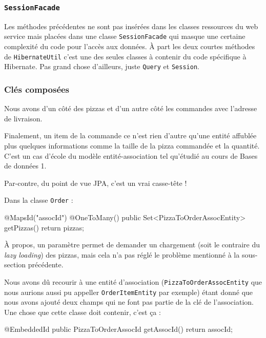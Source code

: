 \cprotect\subsubsection{\verb|SessionFacade|}

Les méthodes précédentes ne sont pas insérées dans les classes ressources du web service mais placées
dans une classe \verb|SessionFacade| qui masque une certaine complexité du code pour l'accès aux données.
À part les deux courtes méthodes de \verb|HibernateUtil| c'est une des seules classes à contenir du code
spécifique à Hibernate. Pas grand chose d'ailleurs, juste \verb|Query| et \verb|Session|.

\subsubsection{Clés composées}

Nous avons d'un côté des pizzas et d'un autre côté les commandes avec l'adresse de livraison.

Finalement, un item de la commande ce n'est rien d'autre qu'une entité affublée plus quelques informations
comme la taille de la pizza commandée et la quantité. C'est un cas d'école du modèle entité-association
tel qu'étudié au cours de Bases de données 1.

Par-contre, du point de vue JPA, c'est un vrai casse-tête !

Dans la classe \verb|Order| :

\begin{javacode}
    @MapsId("assocId")
    @OneToMany()
    public Set<PizzaToOrderAssocEntity> getPizzas() {
        return pizzas;
    }
\end{javacode}

À propos, un paramètre permet de demander un chargement  (soit le contraire du \emph{lazy loading})
des pizzas, mais cela n'a pas réglé le problème mentionné à la sous-section précédente.

Nous avons dû recourir à une entité d'association (\verb|PizzaToOrderAssocEntity| que nous aurions aussi
pu appeller \verb|OrderItemEntity| par exemple)
étant donné que nous avons ajouté deux champs qui ne font pas partie de la clé de l'association.
Une chose que cette classe doit contenir, c'est ça :

\begin{javacode}
    @EmbeddedId
    public PizzaToOrderAssocId getAssocId() {
        return assocId;
    }
\end{javacode}


